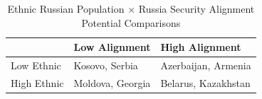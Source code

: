 \begin{table}[!t]
\caption*{
{\large Ethnic Russian Population × Russia Security Alignment} \\ 
{\small Potential Comparisons}
} 
\fontsize{12.0pt}{14.4pt}\selectfont
\begin{tabular*}{\linewidth}{@{\extracolsep{\fill}}lll}
\toprule
 & Low Alignment & High Alignment \\ 
\midrule\addlinespace[2.5pt]
Low Ethnic & {Kosovo, Serbia} & {Azerbaijan, Armenia} \\ 
High Ethnic & {Moldova, Georgia} & {Belarus, Kazakhstan} \\ 
\bottomrule
\end{tabular*}
\end{table}

